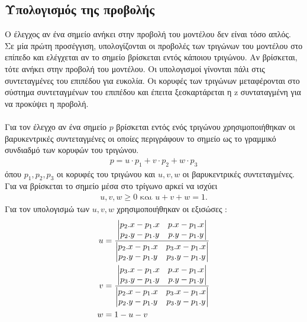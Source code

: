 \documentclass{report}
\begin{document}
\subsection{Υπολογισμός της προβολής}
Ο έλεγχος αν ένα σημείο ανήκει στην προβολή του μοντέλου δεν είναι τόσο απλός. Σε μία πρώτη προσέγγιση, υπολογίζονται οι προβολές των τριγώνων
του μοντέλου στο επίπεδο και ελέγχεται αν το σημείο βρίσκεται εντός κάποιου τριγώνου. Αν βρίσκεται, τότε ανήκει στην προβολή του μοντέλου.
Οι υπολογισμοί γίνονται πάλι στις συντεταγμένες του επιπέδου για ευκολία. Οι κορυφές των τριγώνων μεταφέρονται στο σύστημα συντεταγμένων
του επιπέδου και έπειτα ξεσκαρτάρεται η z συνταταγμένη για να προκύψει η προβολή.
\\\\
Για τον έλεγχο αν ένα σημείο $p$ βρίσκεται εντός ενός τριγώνου χρησιμοποιήθηκαν οι βαρυκεντρικές συντεταγμένες οι οποίες περιγράφουν το
σημείο ως το γραμμικό συνδιαδμό των κορυφών του τριγώνου. 
\begin{align}
    p = u \cdot p_1 + v \cdot p_2 + w \cdot p_3
\end{align}
όπου $p_1, p_2, p_3$ οι κορυφές του τριγώνου και $u, v, w$ οι βαρυκεντρικές συντεταγμένες.\\
Για να βρίσκεται το σημείο μέσα στο τρίγωνο αρκεί να ισχύει 
\begin{align}
    u, v, w \geq 0 \text{ και } u + v + w = 1.
\end{align}
Για τον υπολογισμώ των $u, v, w$ χρησιμοποιήθηκαν οι εξισώσες \cite{barycentric-coordinates}:
\begin{align}\label{barycentric}
    u &= \frac{\begin{vmatrix} 
            p_2.x - p_1.x & p.x - p_1.x \\ 
            p_2.y - p_1.y & p.y - p_1.y 
        \end{vmatrix}}{
        \begin{vmatrix}
            p_2.x - p_1.x & p_3.x - p_1.x \\
            p_2.y - p_1.y & p_3.y - p_1.y
        \end{vmatrix}} \notag \\
    v &= \frac{\begin{vmatrix} 
            p_3.x - p_1.x & p.x - p_1.x \\ 
            p_3.y - p_1.y & p.y - p_1.y 
        \end{vmatrix}}{
        \begin{vmatrix}
            p_2.x - p_1.x & p_3.x - p_1.x \\
            p_2.y - p_1.y & p_3.y - p_1.y
        \end{vmatrix}} \notag \\
    w &= 1 - u - v
\end{align}
\end{document}
